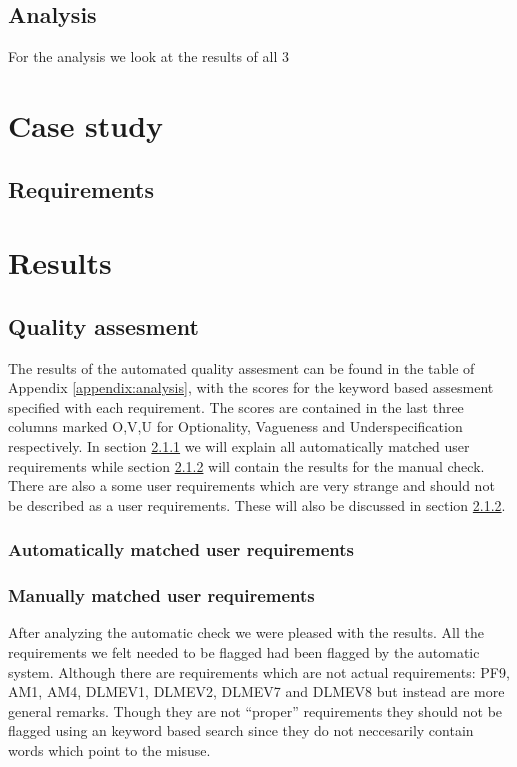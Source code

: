 \documentclass[a4paper,twoside,11pt]{article}
\begin{document}
\subsection{Analysis}
For the analysis we look at the results of all 3 

\section{Case study}
\subsection{Requirements}


\section{Results}
\subsection{Quality assesment}
The results of the automated quality assesment can be found in the table of Appendix \ref{appendix:analysis}, with the scores for the keyword based assesment specified with each requirement. The scores are contained in the last three columns marked {\sc O,V,U} for Optionality, Vagueness and Underspecification respectively. In section \ref{auto_match} we will explain all automatically matched user requirements while section \ref{manual_match} will contain the results for the manual check. \\

There are also a some user requirements which are very strange and should not be described as a user requirements. These will also be discussed in section \ref{manual_match}.

\subsubsection{Automatically matched user requirements}
\label{auto_match}


\subsubsection{Manually matched user requirements}
\label{manual_match}
After analyzing the automatic check we were pleased with the results. All the requirements we felt needed to be flagged had been flagged by the automatic system. Although there are requirements which are not actual requirements: {\sc PF9, AM1, AM4, DLMEV1, DLMEV2, DLMEV7} and  {\sc DLMEV8} but instead are more general remarks. Though they are not ``proper'' requirements they should not be flagged using an keyword based search since they do not neccesarily contain words which point to the misuse.
\end{document}
